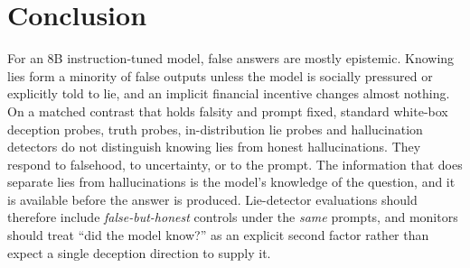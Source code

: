 \documentclass[10pt]{article}
\begin{document}
\section{Conclusion}
For an 8B instruction-tuned model, false answers are mostly epistemic. Knowing lies form a minority of false outputs unless the model is socially pressured or explicitly told to lie, and an implicit financial incentive changes almost nothing. On a matched contrast that holds falsity and prompt fixed, standard white-box deception probes, truth probes, in-distribution lie probes and hallucination detectors do not distinguish knowing lies from honest hallucinations. They respond to falsehood, to uncertainty, or to the prompt. The information that does separate lies from hallucinations is the model's knowledge of the question, and it is available before the answer is produced. Lie-detector evaluations should therefore include \emph{false-but-honest} controls under the \emph{same} prompts, and monitors should treat ``did the model know?'' as an explicit second factor rather than expect a single deception direction to supply it.




\appendix
\end{document}
